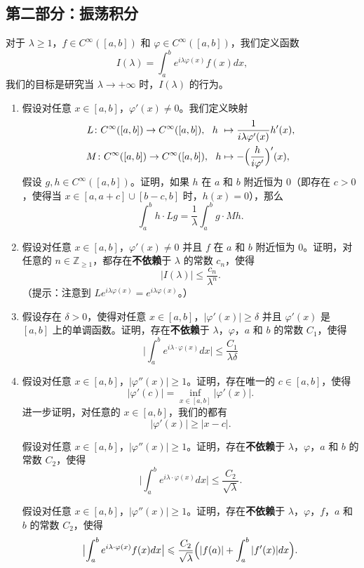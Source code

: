 \subsection{第二部分：振荡积分}

对于 $\lambda \geqslant 1$，$f\in C^\infty([a,b])$ 和 $\varphi \in C^\infty([a,b])$，我们定义函数
\[I(\lambda)=\int_{a}^b e^{i\lambda \varphi(x)}f(x)dx,\]
我们的目标是研究当 $\lambda \rightarrow +\infty$ 时，$I(\lambda)$ 的行为。

\begin{enumerate}[label=C\arabic*)]
\item 假设对任意 $x\in [a,b]$，$\varphi'(x)\neq 0$。我们定义映射
\begin{align*}
L\colon C^\infty([a,b]) \rightarrow C^\infty([a,b]), 	\ \ h  &\mapsto \frac{1}{i\lambda \varphi'(x)}h'(x),\\
M\colon C^\infty([a,b]) \rightarrow C^\infty([a,b]), \ \ h &\mapsto -\Bigl(\frac{h}{i \varphi'}\Bigr)'(x),\\
\end{align*}
假设 $g, h\in C^\infty([a,b])$。证明，如果 $h$ 在 $a$ 和 $b$ 附近恒为 $0$（即存在 $c>0$，使得当 $x\in [a,a+c]\cup [b-c,b]$ 时，$h(x)=0$），那么
\[\int_a^b h \cdot Lg  =\frac{1}{\lambda}\int_{a}^b g \cdot Mh.\]
\item 假设对任意 $x\in [a,b]$，$\varphi'(x)\neq 0$ 并且 $f$ 在 $a$ 和 $b$ 附近恒为 $0$。证明，对任意的 $n\in \mathbb{Z}_{\geqslant 1}$，都存在{\bf 不依赖}于 $\lambda$ 的常数 $c_n$，使得
\[|I(\lambda)|\leqslant \frac{c_n}{\lambda^n}.\]
（提示：注意到 $L e^{i\lambda\varphi(x)}=e^{i\lambda\varphi(x)}$。）
\item 假设存在 $\delta>0$，使得对任意 $x\in [a,b]$，$|\varphi'(x)|\geqslant \delta$ 并且 $\varphi'(x)$ 是 $[a,b]$ 上的单调函数。证明，存在{\bf 不依赖}于 $\lambda$，$\varphi$，$a$ 和 $b$ 的常数 $C_1$，使得
\[\bigl|\int_a^b e^{i\lambda\cdot \varphi(x)}dx\bigr|\leqslant \frac{C_1}{\lambda \delta}\]

\item 假设对任意 $x\in [a,b]$，$|\varphi''(x)|\geqslant 1$。证明，存在唯一的 $c\in [a,b]$，使得
\[|\varphi'(c)|=\displaystyle \inf_{x \in [a,b]}|\varphi'(x)|.\]
进一步证明，对任意的 $x\in [a,b]$，我们的都有
\[|\varphi'(x)|\geqslant |x-c|.\]

\customItem[*C15)] 假设对任意 $x\in [a,b]$，$|\varphi''(x)|\geqslant 1$。证明，存在{\bf 不依赖}于 $\lambda$，$\varphi$，$a$ 和 $b$ 的常数 $C_2$，使得
\[\bigl|\int_a^b e^{i\lambda\cdot \varphi(x)}dx\bigr|\leqslant \frac{C_2}{\sqrt{\lambda}}.\]

\customItem[**C16)] 假设对任意 $x\in [a,b]$，$|\varphi''(x)|\geqslant 1$。证明，存在{\bf 不依赖}于 $\lambda$，$\varphi$，$f$，$a$ 和 $b$ 的常数 $C_2$，使得
\[\bigl|\int_a^b e^{i\lambda\cdot \varphi(x)}f(x)dx\bigr|\leqslant \frac{C_2}{\sqrt{\lambda}}\Bigl(|f(a)|+\int_{a}^b |f'(x)| dx\Bigr).\]

\end{enumerate}

